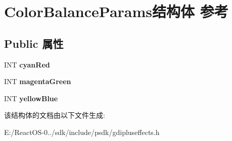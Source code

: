 \hypertarget{struct_color_balance_params}{}\section{Color\+Balance\+Params结构体 参考}
\label{struct_color_balance_params}
\subsection*{Public 属性}
\begin{DoxyCompactItemize}
\item 
\mbox{\label{struct_color_balance_params_ab10fe185c8809958e38111262caa9aca}} 
I\+NT {\bfseries cyan\+Red}
\item 
\mbox{\label{struct_color_balance_params_a1ee49c18c22c791af0872e3aa5de8565}} 
I\+NT {\bfseries magenta\+Green}
\item 
\mbox{\label{struct_color_balance_params_ad94d2cdc46a2ba3c40f7ea348b0b87c2}} 
I\+NT {\bfseries yellow\+Blue}
\end{DoxyCompactItemize}


该结构体的文档由以下文件生成\+:\begin{DoxyCompactItemize}
\item 
E\+:/\+React\+O\+S-\/0../sdk/include/psdk/gdipluseffects.\+h\end{DoxyCompactItemize}
